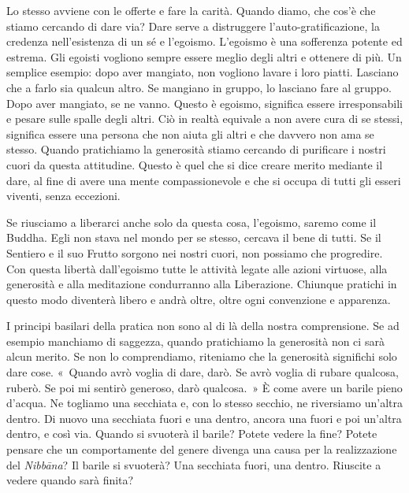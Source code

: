 Lo stesso avviene con le offerte e fare la carità. Quando diamo, che
cos'è che stiamo cercando di dare via? Dare serve a distruggere
l'auto-gratificazione, la credenza nell'esistenza di un sé e l'egoismo.
L'egoismo è una sofferenza potente ed estrema. Gli egoisti vogliono
sempre essere meglio degli altri e ottenere di più. Un semplice esempio:
dopo aver mangiato, non vogliono lavare i loro piatti. Lasciano che a
farlo sia qualcun altro. Se mangiano in gruppo, lo lasciano fare al
gruppo. Dopo aver mangiato, se ne vanno. Questo è egoismo, significa
essere irresponsabili e pesare sulle spalle degli altri. Ciò in realtà
equivale a non avere cura di se stessi, significa essere una persona che
non aiuta gli altri e che davvero non ama se stesso. Quando pratichiamo
la generosità stiamo cercando di purificare i nostri cuori da questa
attitudine. Questo è quel che si dice creare merito mediante il dare, al
fine di avere una mente compassionevole e che si occupa di tutti gli
esseri viventi, senza eccezioni.

Se riusciamo a liberarci anche solo da questa cosa, l'egoismo, saremo
come il Buddha. Egli non stava nel mondo per se stesso, cercava il bene
di tutti. Se il Sentiero e il suo Frutto sorgono nei nostri cuori, non
possiamo che progredire. Con questa libertà dall'egoismo tutte le
attività legate alle azioni virtuose, alla generosità e alla meditazione
condurranno alla Liberazione. Chiunque pratichi in questo modo diventerà
libero e andrà oltre, oltre ogni convenzione e apparenza.

I principi basilari della pratica non sono al di là della nostra
comprensione. Se ad esempio manchiamo di saggezza, quando pratichiamo la
generosità non ci sarà alcun merito. Se non lo comprendiamo, riteniamo
che la generosità significhi solo dare cose. «~Quando avrò voglia di
dare, darò. Se avrò voglia di rubare qualcosa, ruberò. Se poi mi sentirò
generoso, darò qualcosa.~» È come avere un barile pieno d'acqua. Ne
togliamo una secchiata e, con lo stesso secchio, ne riversiamo un'altra
dentro. Di nuovo una secchiata fuori e una dentro, ancora una fuori e
poi un'altra dentro, e così via. Quando si svuoterà il barile? Potete
vedere la fine? Potete pensare che un comportamente del genere divenga
una causa per la realizzazione del \emph{Nibbāna}? Il barile si
svuoterà? Una secchiata fuori, una dentro. Riuscite a vedere quando sarà
finita?

